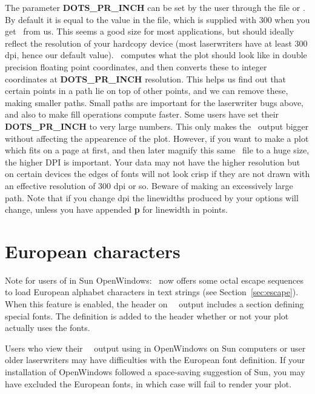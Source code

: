 The parameter {\bf DOTS\_PR\_INCH} can be set by the user through
the  file or .  By default
it is equal to the value in the 
file, which is supplied with 300 when you get \GMT\ from us.
This seems a good size for most applications, but should ideally
reflect the resolution of your hardcopy device (most laserwriters
have at least 300 dpi, hence our default value).  \GMT\ computes what the
plot should look like in double precision floating point
coordinates, and then converts these to integer coordinates at
{\bf DOTS\_PR\_INCH} resolution.  This helps us find out that certain
points in a path lie on top of other points, and we can remove
these, making smaller paths.  Small paths are important for the
laserwriter bugs above, and also to make fill operations compute
faster.  Some users have set their {\bf DOTS\_PR\_INCH} to very large
numbers.  This only makes the \PS\ output bigger
without affecting the appearence of the plot.  However, if you
want to make a plot which fits on a page at first, and then
later magnify this same \PS\ file to a huge size,
the higher DPI is important.  Your data may not have the higher
resolution but on certain devices the edges of fonts will not
look crisp if they are not drawn with an effective resolution
of 300 dpi or so.  Beware of making an excessively large path.
Note that if you change dpi the linewidths produced by your
 options will change, unless you have appended {\bf p}
for linewidth in points.

\section{European characters}
Note for users of  in Sun OpenWindows: \GMT\ now
offers some octal escape sequences to load European alphabet
characters in text strings (see Section~\ref{sec:escape}).  When
this feature is enabled, the header on \GMT\ \PS\ output includes
a section defining special fonts.  The definition is added to
the header whether or not your plot actually uses the fonts.

Users who view their \GMT\ \PS\ output using
 in OpenWindows on Sun computers or user older
laserwriters may have difficulties with the European font
definition.  If your installation of OpenWindows followed
a space-saving suggestion of Sun, you may have excluded the
European fonts, in which case  will fail
to render your plot.

